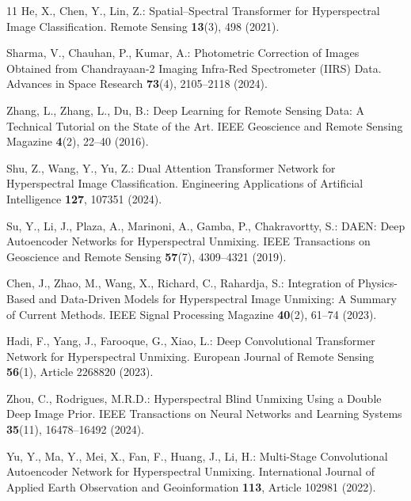 \documentclass[runningheads]{llncs}
\begin{document}
\begin{thebibliography}{11}
He, X., Chen, Y., Lin, Z.:
Spatial--Spectral Transformer for Hyperspectral Image Classification.
Remote Sensing \textbf{13}(3), 498 (2021).

Sharma, V., Chauhan, P., Kumar, A.:
Photometric Correction of Images Obtained from Chandrayaan-2 Imaging Infra-Red Spectrometer (IIRS) Data.
Advances in Space Research
\textbf{73}(4), 2105--2118 (2024).

Zhang, L., Zhang, L., Du, B.:
Deep Learning for Remote Sensing Data: A Technical Tutorial on the State of the Art.
IEEE Geoscience and Remote Sensing Magazine
\textbf{4}(2), 22--40 (2016).

Shu, Z., Wang, Y., Yu, Z.:
Dual Attention Transformer Network for Hyperspectral Image Classification.
Engineering Applications of Artificial Intelligence
\textbf{127}, 107351 (2024).


Su, Y., Li, J., Plaza, A., Marinoni, A., Gamba, P., Chakravortty, S.:
DAEN: Deep Autoencoder Networks for Hyperspectral Unmixing.
IEEE Transactions on Geoscience and Remote Sensing
\textbf{57}(7), 4309--4321 (2019).

Chen, J., Zhao, M., Wang, X., Richard, C., Rahardja, S.:
Integration of Physics-Based and Data-Driven Models for Hyperspectral
Image Unmixing: A Summary of Current Methods.
IEEE Signal Processing Magazine
\textbf{40}(2), 61--74 (2023).

Hadi, F., Yang, J., Farooque, G., Xiao, L.:
Deep Convolutional Transformer Network for Hyperspectral Unmixing.
European Journal of Remote Sensing
\textbf{56}(1), Article 2268820 (2023).

Zhou, C., Rodrigues, M.R.D.:
Hyperspectral Blind Unmixing Using a Double Deep Image Prior.
IEEE Transactions on Neural Networks and Learning Systems
\textbf{35}(11), 16478--16492 (2024).

Yu, Y., Ma, Y., Mei, X., Fan, F., Huang, J., Li, H.:
Multi-Stage Convolutional Autoencoder Network for Hyperspectral Unmixing.
International Journal of Applied Earth Observation and Geoinformation
\textbf{113}, Article 102981 (2022).

\end{thebibliography}
\end{document}
